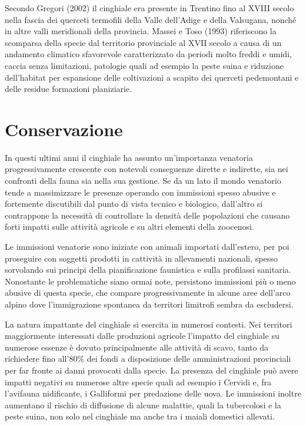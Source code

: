 \begin{multicols}{2}
Secondo Gregori (2002) il cinghiale era presente in Trentino fino al
XVIII secolo nella fascia dei querceti termofili della Valle
dell{\textquoteright}Adige e della Valsugana, nonch\'e in altre valli
meridionali della provincia. Massei e Toso (1993) riferiscono la
scomparsa della specie dal territorio provinciale al XVII secolo a
causa di un andamento climatico sfavorevole caratterizzato da periodi
molto freddi e umidi, caccia senza limitazioni, patologie quali ad
esempio la peste suina e riduzione dell{\textquoteright}habitat per
espansione delle coltivazioni a scapito dei querceti pedemontani e
delle residue formazioni planiziarie.


\section{Conservazione}  In questi ultimi anni il cinghiale ha assunto
un{\textquoteright}importanza venatoria progressivamente crescente con
notevoli conseguenze dirette e indirette, sia nei confronti della fauna
sia nella sua gestione. Se da un lato il mondo venatorio tende a
massimizzare le presenze operando con immissioni spesso abusive e
fortemente discutibili dal punto di vista tecnico e biologico,
dall{\textquoteright}altro si contrappone la necessit\`a di controllare
la densit\`a delle popolazioni che causano forti impatti sulle
attivit\`a agricole e su altri elementi della zoocenosi. 

Le immissioni venatorie sono iniziate con animali importati
dall{\textquoteright}estero, per poi proseguire con soggetti prodotti
in cattivit\`a in allevamenti nazionali, spesso sorvolando sui principi
della pianificazione faunistica e sulla profilassi sanitaria.
Nonostante le problematiche siano ormai note, persistono immissioni
pi\`u o meno abusive di questa specie, che compare progressivamente in
alcune aree dell{\textquoteright}arco alpino dove
l{\textquoteright}immigrazione spontanea da territori limitrofi sembra
da escludersi. 

La natura impattante del cinghiale si esercita in numerosi contesti. Nei
territori maggiormente interessati dalle produzioni agricole
l{\textquoteright}impatto del cinghiale su numerose essenze \`e dovuto
principalmente alle attivit\`a di scavo, tanto da richiedere fino
all{\textquoteright}80\% dei fondi a disposizione delle amministrazioni
provinciali per far fronte ai danni provocati dalla specie. La presenza
del cinghiale pu\`o avere impatti negativi su numerose altre specie
quali ad esempio i Cervidi e, fra l{\textquoteright}avifauna
nidificante, i Galliformi per predazione delle uova. Le immissioni
inoltre aumentano il rischio di diffusione di alcune malattie, quali la
tubercolosi e la peste suina, non solo nel cinghiale ma anche tra i
maiali domestici allevati.


\end{multicols}
